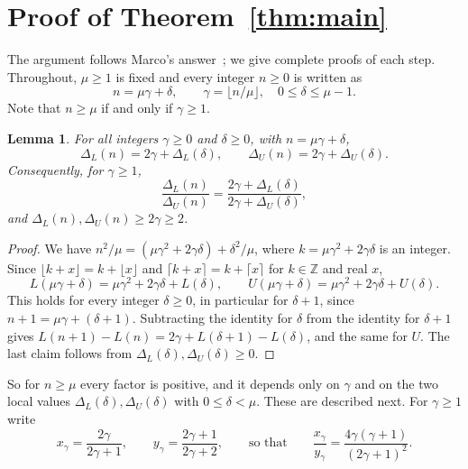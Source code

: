\documentclass{amsart}
\newtheorem{lemma}{Lemma}
\theoremstyle{definition}
\theoremstyle{remark}
\newcommand{\DL}{\Delta_L}
\newcommand{\DU}{\Delta_U}
\begin{document}
\section{Proof of Theorem~\ref{thm:main}}\label{sec:proof}

The argument follows Marco's answer~\cite{marco2025}; we give complete proofs of each step. Throughout, $\mu\ge1$ is fixed and every integer $n\ge0$ is written as
\[
n=\mu\gamma+\delta,\qquad \gamma=\lfloor n/\mu\rfloor,\quad 0\le\delta\le\mu-1 .
\]
Note that $n\ge\mu$ if and only if $\gamma\ge1$.

\begin{lemma}\label{lem:shift}
For all integers $\gamma\ge0$ and $\delta\ge0$, with $n=\mu\gamma+\delta$,
\[
\DL(n)=2\gamma+\DL(\delta),\qquad \DU(n)=2\gamma+\DU(\delta).
\]
Consequently, for $\gamma\ge1$,
\[
\frac{\DL(n)}{\DU(n)}=\frac{2\gamma+\DL(\delta)}{2\gamma+\DU(\delta)},
\]
and $\DL(n),\DU(n)\ge2\gamma\ge2$.
\end{lemma}

\begin{proof}
We have $n^2/\mu=(\mu\gamma^2+2\gamma\delta)+\delta^2/\mu$, where $k=\mu\gamma^2+2\gamma\delta$ is an integer. Since $\lfloor k+x\rfloor=k+\lfloor x\rfloor$ and $\lceil k+x\rceil=k+\lceil x\rceil$ for $k\in\mathbb Z$ and real $x$,
\[
L(\mu\gamma+\delta)=\mu\gamma^2+2\gamma\delta+L(\delta),\qquad U(\mu\gamma+\delta)=\mu\gamma^2+2\gamma\delta+U(\delta).
\]
This holds for every integer $\delta\ge0$, in particular for $\delta+1$, since $n+1=\mu\gamma+(\delta+1)$. Subtracting the identity for $\delta$ from the identity for $\delta+1$ gives $L(n+1)-L(n)=2\gamma+L(\delta+1)-L(\delta)$, and the same for $U$. The last claim follows from $\DL(\delta),\DU(\delta)\ge0$.
\end{proof}

So for $n\ge\mu$ every factor is positive, and it depends only on $\gamma$ and on the two local values $\DL(\delta),\DU(\delta)$ with $0\le\delta<\mu$. These are described next. For $\gamma\ge1$ write
\[
x_\gamma=\frac{2\gamma}{2\gamma+1},\qquad y_\gamma=\frac{2\gamma+1}{2\gamma+2},\qquad\text{so that}\qquad
\frac{x_\gamma}{y_\gamma}=\frac{4\gamma(\gamma+1)}{(2\gamma+1)^2}.
\]
\end{document}
